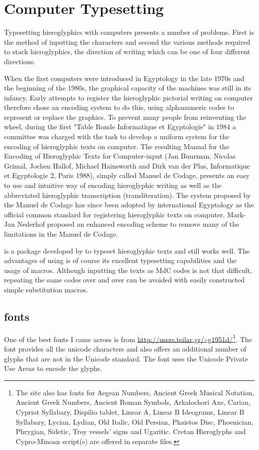 \section{Computer Typesetting}

Typesetting hieroglyphics with computers presents a number of problems. First is the method of inputting the characters and second the various methods required to stack hieroglyphics, the direction of writing which can be one of four different directions.

When the first computers were introduced in Egyptology in the late 1970s and the beginning of the 1980s, the graphical capacity of the machines was still in its infancy. Early attempts to register the hieroglyphic pictorial writing on computer therefore chose an encoding system to do this, using alphanumeric codes to represent or replace the graphics. To prevent many people from reinventing the wheel, during the first "Table Ronde Informatique et Egyptologie" in 1984 a committee was charged with the task to develop a uniform system for the encoding of hieroglyphic texts on computer. The resulting Manual for the Encoding of Hieroglyphic Texts for Computer-input (Jan Buurman, Nicolas Grimal, Jochen Hallof, Michael Hainsworth and Dirk van der Plas, Informatique et Egyptologie 2, Paris 1988), simply called Manuel de Codage, presents an easy to use and intuitive way of encoding hieroglyphic writing as well as the abbreviated hieroglyphic transcription (transliteration). The system proposed by the Manuel de Codage has since been adopted by international Egyptology as the official common standard for registering hieroglyphic texts on computer. Mark-Jan Nederhof proposed an enhanced encoding scheme to remove many of the limitations in the Manuel de Codage.

 is a \latexe package developed by to typeset hieroglyphic texts and still works well. The advantages of using \tex is of course its excellent typesetting capabilities and the usage of macros. Although inputting the texts as MdC codes is not that difficult, repeating the same codes over and over can be avoided with easily constructed simple substitution macros. 

\subsection{fonts}

One of the best fonts I came across is  from \url{http://users.teilar.gr/~g1951d/}\footnote{The site also has fonts for Aegean Numbers, Ancient Greek Musical Notation, Ancient Greek Numbers, Ancient Roman Symbols, Arkalochori Axe, Carian, Cypriot Syllabary, Dispilio tablet, Linear A, Linear B Ideograms, Linear B Syllabary, Lycian, Lydian, Old Italic, Old Persian, Phaistos Disc, Phoenician, Phrygian, Sidetic, Troy vessels’ signs and Ugaritic. Cretan Hieroglyphs and Cypro-Minoan script(s) are offered in separate files.}. The font provides all the unicode characters and also offers an additional number of glyphs that are not in the Unicode standard. The font uses the Unicode Private Use Areas to encode the glyphs. 

